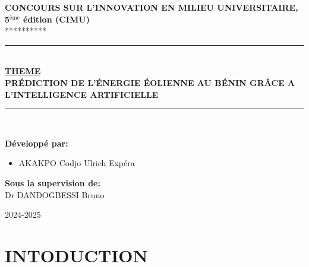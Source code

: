 \documentclass[12pt]{article}
\begin{document}
\begin{center}
	\vspace{3cm}
	{\Large \textbf{CONCOURS SUR L'INNOVATION EN MILIEU UNIVERSITAIRE, 5$^\text{ème}$ édition (CIMU)}} \\[0.2cm]
	********** \\[2cm]
	
	\rule{\linewidth}{0.5mm} \\[0.7cm]
	{\Huge \textbf{\color{blue} \underline{THEME}}} \vspace{0.5cm}
	{\Large \textbf{\color{black} \\PRÉDICTION DE L'ÉNERGIE ÉOLIENNE AU BÉNIN GRÂCE A L'INTELLIGENCE ARTIFICIELLE }} \\[0.4cm]
	\rule{\linewidth}{0.5mm} \\[1.5cm]
	\vspace{2cm}
	
	\begin{flushleft}
		{\large \textbf{Développé par:}}
		\begin{itemize}[label=$ $]
			\item AKAKPO Codjo Ulrich Expéra
		\end{itemize}
	\end{flushleft}
	
	\begin{flushright}
		\vspace{-1.5cm}
		{\large \textbf{Sous la supervision de:}}\\
		Dr DANDOGBESSI Bruno
	\end{flushright}
	
	\vfill
	{\large 2024-2025}
\end{center}

\newpage
\tableofcontents
\newpage

\section{INTODUCTION}
\end{document}
